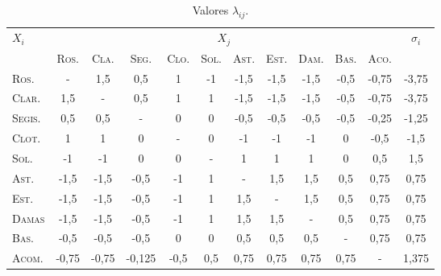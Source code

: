 \begin{table}[!ht]
	\centering\footnotesize
	\begin{tabular}{lccccccccccc}
		\toprule
		$X_i$&\multicolumn{10}{c}{$X_j$}&$\sigma_{i}$\\
		 \cline{2-11}
		&\textsc{Ros.} & \textsc{Cla.}& \textsc{Seg.}& \textsc{Clo.}& \textsc{Sol.}& \textsc{Ast.}& \textsc{Est.}& \textsc{Dam.}& \textsc{Bas.}&  \textsc{Aco.} & \\
		\midrule
		\textsc{Ros.}  &-		&1{,}5	&0{,}5   &1     &-1   &-1{,}5&-1{,}5&-1{,}5&-0{,}5&-0{,}75&-3{,}75  \\
		\textsc{Clar.} &1{,}5	&      -&0{,}5   &1	    &1	  &-1{,}5&-1{,}5&-1{,}5&-0{,}5&-0{,}75&-3{,}75   \\
		\textsc{Segis.}&0{,}5	&0{,}5	&-       &0	    &0    &-0{,}5&-0{,}5&-0{,}5&-0{,}5&-0{,}25&-1{,}25   \\
		\textsc{Clot.} &1		&1		&0       &-	    &0    & -1   &-1    &-1    &0     &-0{,}5 &-1{,}5   \\
		\textsc{Sol.}  &-1		&-1		&0       & 0    &-    &  1   & 1    & 1    &  0   & 0{,}5 &1{,}5     \\
		\textsc{Ast.}  &-1{,}5	&-1{,}5	&-0{,}5  & -1   & 1   &-     &1{,}5 &1{,}5 &0{,}5 & 0{,}75&0{,}75   \\
		\textsc{Est.}  &-1{,}5	&-1{,}5	&-0{,}5  & -1   & 1   & 1{,}5&-     &1{,}5 &0{,}5 & 0{,}75&0{,}75   \\
		\textsc{Damas} &-1{,}5	&-1{,}5	&-0{,}5  & -1   & 1   &1{,}5 &1{,}5 &-     &0{,}5 & 0{,}75&0{,}75   \\
		\textsc{Bas.}  &-0{,}5	&-0{,}5	&-0{,}5  &  0   & 0   &0{,}5 &0{,}5 &0{,}5 &-     &0{,}75& 0{,}75   \\
		\textsc{Acom.} &-0{,}75	&-0{,}75&-0{,}125&-0{,}5&0{,}5&0{,}75&0{,}75&0{,}75&0{,}75&-     &  1{,}375 \\
		\bottomrule
	\end{tabular}
	\caption{Valores $\lambda_{ij}$.}
	\label{tab:lambda}
\end{table}
